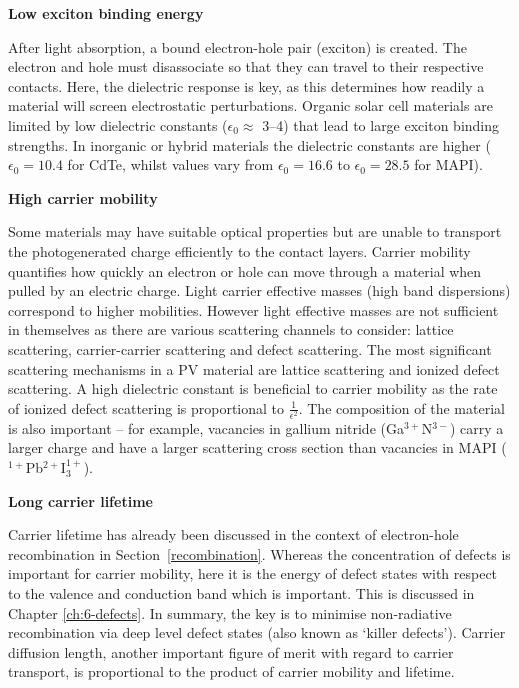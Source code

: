 \textbf{Low exciton binding energy}

After light absorption, a bound electron-hole pair (exciton) is created. The electron and hole must disassociate so that they can travel to their respective contacts. Here, the dielectric response is key, as this determines how readily a material will screen electrostatic perturbations. Organic solar cell materials are limited by low dielectric constants ($\epsilon_0 \approx$ 3--4) that lead to large exciton binding strengths.\autocite{Brebels2017} In inorganic or hybrid materials the dielectric constants are higher ($\epsilon_0=10.4$ for CdTe,\autocite{Madelung2004} whilst values vary from $\epsilon_0=16.6$ to $\epsilon_0=28.5$ for MAPI\autocite{Wilson2019}).


\textbf{High carrier mobility}

Some materials may have suitable optical properties but are unable to transport the photogenerated charge efficiently to the contact layers. Carrier mobility quantifies how quickly an electron or hole can move through a material when pulled by an electric charge. 
Light carrier effective masses (high band dispersions) correspond to higher mobilities. However light effective masses are not sufficient in themselves as there are various scattering channels to consider: lattice scattering, carrier-carrier scattering and defect scattering. The most significant scattering mechanisms in a PV material are lattice scattering and ionized defect scattering.
A high dielectric constant is beneficial to carrier mobility as the rate of ionized defect scattering is proportional to $\frac{1}{\epsilon^2}$. The composition of the material is also important -- for example, vacancies in gallium nitride (Ga$^{3+}$N$^{3-}$) carry a larger charge and have a larger scattering cross section than vacancies in MAPI ($^{1+}$Pb$^{2+}$I$^{1+}_3$).


\textbf{Long carrier lifetime}

Carrier lifetime has already been discussed in the context of electron-hole recombination in Section\ \ref{recombination}. Whereas the concentration of defects is important for carrier mobility, here it is the energy of defect states with respect to the valence and conduction band which is important. This is discussed in Chapter \ref{ch:6-defects}. In summary, the key is to minimise non-radiative recombination via deep level defect states (also known as `killer defects'). Carrier diffusion length, another important figure of merit with regard to carrier transport, is proportional to the product of carrier mobility and lifetime.



